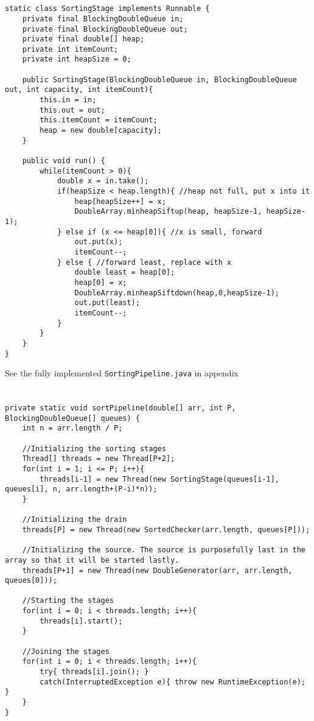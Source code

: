 \documentclass{ituhandin}
\begin{document}
\section{}
\begin{lstlisting}[caption=Implemented code for the Sorting stage]
static class SortingStage implements Runnable {
    private final BlockingDoubleQueue in;
    private final BlockingDoubleQueue out;
    private final double[] heap; 
    private int itemCount;
    private int heapSize = 0;

    public SortingStage(BlockingDoubleQueue in, BlockingDoubleQueue out, int capacity, int itemCount){
        this.in = in;
        this.out = out;
        this.itemCount = itemCount;
        heap = new double[capacity];
    }

    public void run() { 
        while(itemCount > 0){
            double x = in.take();
            if(heapSize < heap.length){ //heap not full, put x into it
                heap[heapSize++] = x;
                DoubleArray.minheapSiftup(heap, heapSize-1, heapSize-1);
            } else if (x <= heap[0]){ //x is small, forward
                out.put(x);
                itemCount--;
            } else { //forward least, replace with x
                double least = heap[0];
                heap[0] = x;
                DoubleArray.minheapSiftdown(heap,0,heapSize-1);
                out.put(least);
                itemCount--;
            }
        }
    }
}
\end{lstlisting}
See the fully implemented \texttt{SortingPipeline.java} in appendix 
\newpage
\section{}
\begin{lstlisting}[caption=Implemented code for setting up and starting stages]
private static void sortPipeline(double[] arr, int P, BlockingDoubleQueue[] queues) {
    int n = arr.length / P;

    //Initializing the sorting stages
    Thread[] threads = new Thread[P+2];
    for(int i = 1; i <= P; i++){
        threads[i-1] = new Thread(new SortingStage(queues[i-1], queues[i], n, arr.length+(P-i)*n)); 
    }

    //Initializing the drain
    threads[P] = new Thread(new SortedChecker(arr.length, queues[P]));

    //Initializing the source. The source is purposefully last in the array so that it will be started lastly.
    threads[P+1] = new Thread(new DoubleGenerator(arr, arr.length, queues[0]));

    //Starting the stages
    for(int i = 0; i < threads.length; i++){
        threads[i].start();
    }

    //Joining the stages
    for(int i = 0; i < threads.length; i++){
        try{ threads[i].join(); }
        catch(InterruptedException e){ throw new RuntimeException(e); }
    }
}
\end{lstlisting}
\end{document}
